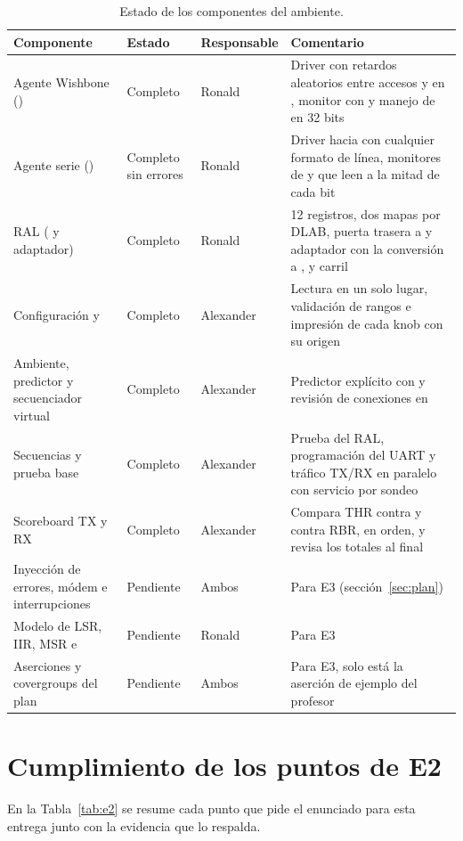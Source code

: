 \documentclass[11pt,a4paper]{article}
\newcommand{\cab}{\rowcolor{cabecera}}
\begin{document}
\begin{table}[h]
\centering
\caption{Estado de los componentes del ambiente.}
\label{tab:estado}
\begin{tabular}{|L{4.3cm}|L{2.4cm}|L{2.1cm}|L{7.6cm}|}
\hline
\cab \textbf{Componente} & \textbf{Estado} & \textbf{Responsable} & \textbf{Comentario} \\ \hline
Agente Wishbone () & Completo & Ronald & Driver con retardos aleatorios entre accesos y en , monitor con  y manejo de  en 32 bits \\ \hline
Agente serie () & Completo sin errores & Ronald & Driver hacia  con cualquier formato de línea, monitores de  y  que leen a la mitad de cada bit \\ \hline
RAL ( y adaptador) & Completo & Ronald & 12 registros, dos mapas por DLAB, puerta trasera a  y adaptador con la conversión a ,  y carril \\ \hline
Configuración y  & Completo & Alexander & Lectura en un solo lugar, validación de rangos e impresión de cada knob con su origen \\ \hline
Ambiente, predictor y secuenciador virtual & Completo & Alexander & Predictor explícito con  y revisión de conexiones en  \\ \hline
Secuencias y prueba base & Completo & Alexander & Prueba del RAL, programación del UART y tráfico TX/RX en paralelo con servicio por sondeo \\ \hline
Scoreboard TX y RX & Completo & Alexander & Compara THR contra  y  contra RBR, en orden, y revisa los totales al final \\ \hline
Inyección de errores, módem e interrupciones & Pendiente & Ambos & Para E3 (sección~\ref{sec:plan}) \\ \hline
Modelo de LSR, IIR, MSR e  & Pendiente & Ronald & Para E3 \\ \hline
Aserciones y covergroups del plan & Pendiente & Ambos & Para E3, solo está la aserción de ejemplo del profesor \\ \hline
\end{tabular}
\end{table}

\section{Cumplimiento de los puntos de E2}
En la Tabla~\ref{tab:e2} se resume cada punto que pide el enunciado para esta entrega junto con la evidencia que lo respalda.
\end{document}
